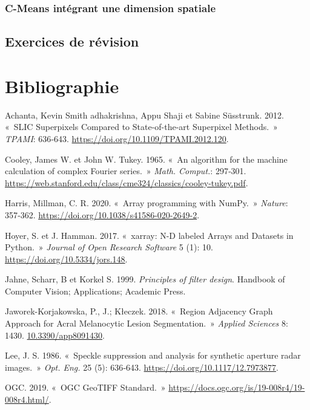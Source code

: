 \documentclass[
  11pt,
  letterpaper,
  open=any,
  twoside=false,
  french]{scrbook}
\newlength{\cslhangindent}
\newenvironment{CSLReferences}[2] %
 {\begin{list}{}{%
  \setlength{\itemindent}{0pt}
  \setlength{\leftmargin}{0pt}
  \setlength{\parsep}{0pt}
  \ifodd #1
   \setlength{\leftmargin}{\cslhangindent}
   \setlength{\itemindent}{-1\cslhangindent}
  \fi
  \setlength{\itemsep}{#2\baselineskip}}}
 {\end{list}}
\begin{document}
\subsection{C-Means intégrant une dimension spatiale}\label{sec-0622}

\section{Exercices de révision}\label{sec-064}


\chapter*{Bibliographie}\label{bibliographie}


\label{refs}
\begin{CSLReferences}{1}{0}
Achanta, Kevin Smith adhakrishna, Appu Shaji et Sabine Süsstrunk. 2012.
{«~SLIC Superpixels Compared to State-of-the-art Superpixel Methods.~»}
\emph{{TPAMI}}: 636‑643. \url{https://doi.org/10.1109/TPAMI.2012.120}.

Cooley, James W. et John W. Tukey. 1965. {«~An algorithm for the machine
calculation of complex Fourier series.~»} \emph{{Math. Comput.}}:
297‑301.
\url{https://web.stanford.edu/class/cme324/classics/cooley-tukey.pdf}.

Harris, Millman, C. R. 2020. {«~Array programming with NumPy.~»}
\emph{{Nature}}: 357‑362.
\url{https://doi.org/10.1038/s41586-020-2649-2}.

Hoyer, S. et J. Hamman. 2017. {«~xarray: N-D labeled Arrays and Datasets
in Python.~»} \emph{{Journal of Open Research Software}} 5 (1): 10.
\url{https://doi.org/10.5334/jors.148}.

Jahne, Scharr, B et Korkel S. 1999. \emph{Principles of filter design}.
Handbook of Computer Vision; Applications; Academic Press.

Jaworek-Korjakowska, P., J.; Kłeczek. 2018. {«~Region Adjacency Graph
Approach for Acral Melanocytic Lesion Segmentation.~»} \emph{{Applied
Sciences}} 8: 1430.
\href{https://10.3390/app8091430}{10.3390/app8091430}.

Lee, J. S. 1986. {«~Speckle suppression and analysis for synthetic
aperture radar images.~»} \emph{{Opt. Eng.}} 25 (5): 636‑643.
\url{https://doi.org/10.1117/12.7973877}.

OGC. 2019. {«~{OGC GeoTIFF Standard}.~»}
\url{https://docs.ogc.org/is/19-008r4/19-008r4.html/}.

\end{CSLReferences}


\backmatter
\end{document}
